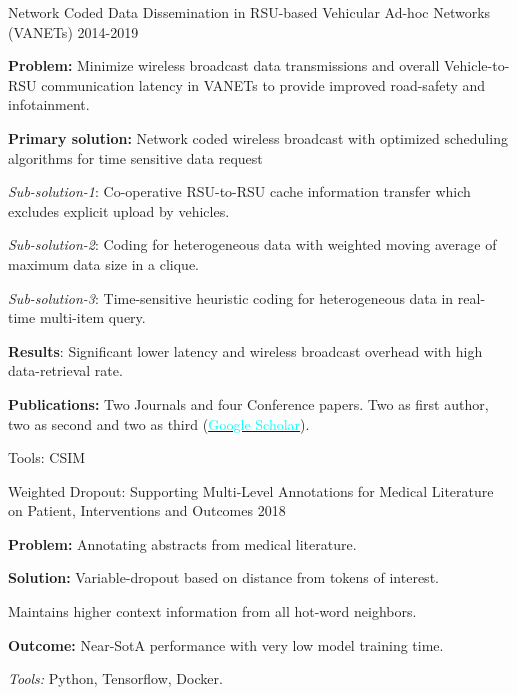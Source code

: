 \begin{cventries}
\cventry
  {} %
  {Network Coded Data Dissemination in RSU-based Vehicular Ad-hoc Networks (VANETs)} %
  {2014-2019} %
  {} %
  {
    \vspace{-3mm}
    \begin{cvitems} %
      \item {\textbf{Problem:} Minimize wireless broadcast data transmissions and overall Vehicle-to-RSU communication latency in VANETs to provide improved road-safety and infotainment.}
      \item {\textbf{Primary solution:} Network coded wireless broadcast with optimized scheduling algorithms for time sensitive data request}
      \item {\textit{Sub-solution-1}: Co-operative RSU-to-RSU cache information transfer which excludes explicit upload by vehicles.}
      \item {\textit{Sub-solution-2}: Coding for heterogeneous data with weighted moving average of maximum data size in a clique.}
      \item {\textit{Sub-solution-3}: Time-sensitive heuristic coding for heterogeneous data in real-time multi-item query.}
      \item {\textbf{Results}: Significant lower latency and wireless broadcast overhead with high data-retrieval rate.}
      \item {\textbf{Publications:} Two Journals and four Conference papers. Two as first author, two as second and two as third (\href{https://scholar.google.com/citations?user=hYY1wDEAAAAJ&hl=en}{\textcolor{cyan}{Google Scholar}}).}
      \item {Tools: CSIM}
    \end{cvitems}
  }
  {}

\cventry
    {}
    {Weighted Dropout: Supporting Multi-Level Annotations for Medical Literature on Patient, Interventions and Outcomes} %
    {2018} %
    {}
    {
      \vspace{-3mm}
      \begin{cvitems} %
        \item {\textbf{Problem:} Annotating abstracts from medical literature.}
        \item {\textbf{Solution:} Variable-dropout based on distance from tokens of interest.}
        \item {Maintains higher context information from all hot-word neighbors.}
        \item {\textbf{Outcome:} Near-SotA performance with very low model training time.}
        \item {\textit{Tools:} Python, Tensorflow, Docker.}
      \end{cvitems}
    }
    {}


\end{cventries}
